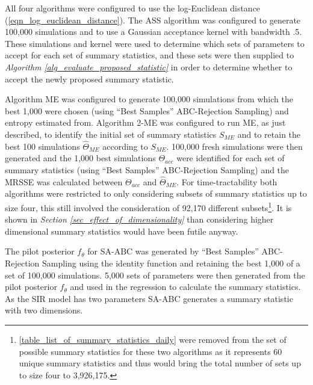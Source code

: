 \documentclass[11pt,a4paper]{article}
\theoremstyle{break}
\begin{document}
  \par All four algorithms were configured to use the log-Euclidean distance (\ref{eqn_log_euclidean_distance}). The ASS algorithm was configured to generate 100,000 simulations and to use a Gaussian acceptance kernel with bandwidth .5. These simulations and kernel were used to determine which sets of parameters to accept for each set of summary statistics, and these sets were then supplied to \textit{Algorithm \ref{alg_evaluate_proposed_statistic}} in order to determine whether to accept the newly proposed summary statistic.

  \par Algorithm ME was configured to generate 100,000 simulations from which the best 1,000 were chosen (using ``Best Samples'' ABC-Rejection Sampling) and entropy estimated from. Algorithm 2-ME was configured to run ME, as just described, to identify the initial set of summary statistics $S_{ME}$ and to retain the best 100 simulations $\hat\Theta_{ME}$ according to $S_{ME}$. 100,000 fresh simulations were then generated and the 1,000 best simulations $\Theta_{acc}$ were identified for each set of summary statistics (using ``Best Samples'' ABC-Rejection Sampling) and the MRSSE was calculated between $\Theta_{acc}$ and $\hat\Theta_{ME}$. For time-tractability both algorithms were restricted to only considering subsets of summary statistics up to size four, this still involved the consideration of 92,170 different subsets\footnote{\ref{table_list_of_summary_statistics_daily} were removed from the set of possible summary statistics for these two algorithms as it represents 60 unique summary statistics and thus would bring the total number of sets up to size four to 3,926,175.}. It is shown in \textit{Section \ref{sec_effect_of_dimensionality}} than considering higher dimensional summary statistics would have been futile anyway.

  \par The pilot posterior $f_{\theta}$ for SA-ABC was generated by ``Best Samples'' ABC-Rejection Sampling using the identity function and retaining the best 1,000 of a set of 100,000 simulations. 5,000 sets of parameters were then generated from the pilot posterior $f_\theta$ and used in the regression to calculate the summary statistics. As the SIR model has two parameters SA-ABC generates a summary statistic with two dimensions.
\end{document}
